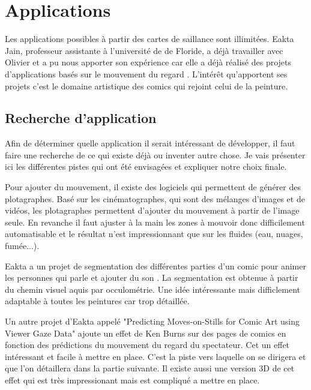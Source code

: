 \chapter{Applications}

\par
Les applications possibles à partir des cartes de saillance sont illimitées. Eakta Jain, professeur assistante à l'université de de Floride, a déjà travailler avec Olivier et a pu nous apporter son expérience car elle a déjà réalisé des projets d'applications basés sur le mouvement du regard \cite{eaktalab}. L'intérêt qu'apportent ses projets c'est le domaine artistique des comics qui rejoint celui de la peinture.

\section{Recherche d'application}

\par
Afin de déterminer quelle application il serait intéressant de développer, il faut faire une recherche de ce qui existe déjà ou inventer autre chose. Je vais présenter ici les différentes pistes qui ont été envisagées et expliquer notre choix finale.

\par
Pour ajouter du mouvement, il existe des logiciels qui permettent de générer des plotagraphes. Basé sur les cinématographes, qui sont des mélanges d'images et de vidéos, les plotagraphes permettent d'ajouter du mouvement à partir de l'image seule. En revanche il faut ajuster à la main les zones à mouvoir donc difficilement automatisable et le résultat n'est impressionnant que sur les fluides (eau, nuages, fumée...).

\par
Eakta a un projet de segmentation des différentes parties d'un comic pour animer les personnes qui parle et ajouter du son \cite{segmentationcomics}. La segmentation est obtenue à partir du chemin visuel aquis par occulométrie. Une idée intéressante mais difficlement adaptable à toutes les peintures car trop détaillée.

\par
Un autre projet d'Eakta appelé "Predicting Moves-on-Stills for Comic Art using Viewer Gaze Data" \cite{kenburns} ajoute un effet de Ken Burns sur des pages de comics en fonction des prédictions du mouvement du regard du spectateur. Cet un effet intéressant et facile à mettre en place. C'est la piste vers laquelle on se dirigera et que l'on détaillera dans la partie suivante. Il existe aussi une version 3D de cet effet \cite{kenburns3D} qui est très impressionant mais est compliqué a mettre en place.

